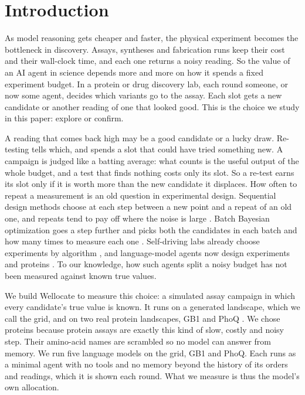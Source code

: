 \section{Introduction}
\label{sec:intro}

As model reasoning gets cheaper and faster, the physical experiment becomes the bottleneck in discovery. Assays,
syntheses and fabrication runs keep their cost and their wall-clock time, and each one returns a noisy reading. So the
value of an AI agent in science depends more and more on how it spends a fixed experiment budget. In a protein or drug
discovery lab, each round someone, or now some agent, decides which variants go to the assay. Each slot gets a new candidate or another reading of one that looked good. This is the choice we study in this paper: explore or confirm.

A reading that comes back high may be a good candidate or a lucky draw. Re-testing tells which, and spends a slot that
could have tried something new. A campaign is judged like a batting average: what counts is the useful output of the
whole budget, and a test that finds nothing costs only its slot. So a re-test earns its slot only if it is worth more
than the new candidate it displaces. How often to repeat a measurement is an old question in experimental design. Sequential design
methods choose at each step between a new point and a repeat of an old one, and repeats tend to pay off where the
noise is large \citep{binois2019replication}. Batch Bayesian optimization goes a step further and picks both the
candidates in each batch and how many times to measure each one \citep{dai2023replicable}. Self-driving labs
already choose experiments by algorithm \citep{rapp2024selfdriving,tom2024selfdriving}, and language-model agents
now design experiments \citep{boiko2023coscientist,roohani2024biodiscovery} and proteins \citep{biodesignbench2026}. To our knowledge, how such agents split a noisy budget has
not been measured against known true values.

We build Wellocate to measure this choice: a simulated assay campaign in which every candidate's true value is
known. It runs on a generated landscape, which we call the grid, and on two real protein landscapes, GB1 and PhoQ
\citep{wu2016adaptation,podgornaia2015phoq}. We chose proteins because protein assays are exactly this kind of slow, costly and noisy step. Their amino-acid names are scrambled so no model can answer from memory. We run five language models on
the grid, GB1 and PhoQ. Each runs as a minimal agent with no tools and no memory beyond the history of its orders and readings, which it is shown each round. What we measure is thus the model's own allocation.

